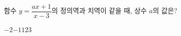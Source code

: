 \hspace*{2mm}\begin{minipage}[t]{\dimexpr\linewidth-2mm\relax}\vspace{0pt}
함수 $y=\dfrac{ax+1}{x-3}$의 정의역과 치역이 같을 때, 상수 $a$의 값은?
\begin{choices32}{$-2$}{$-1$}{$1$}{$2$}{$3$}\end{choices32}\end{minipage}
